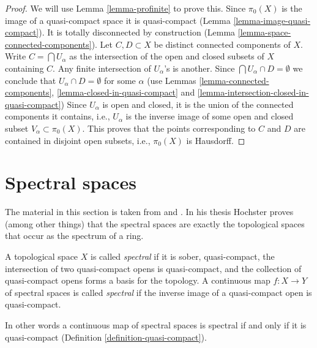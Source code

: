 \begin{proof}
We will use Lemma \ref{lemma-profinite} to prove this.
Since $\pi_0(X)$ is the image of a quasi-compact space it is
quasi-compact (Lemma \ref{lemma-image-quasi-compact}).
It is totally disconnected by construction
(Lemma \ref{lemma-space-connected-components}).
Let $C, D \subset X$ be distinct connected components of $X$.
Write $C = \bigcap U_\alpha$ as the intersection of the open and
closed subsets of $X$ containing $C$. Any finite intersection
of $U_\alpha$'s is another. Since $\bigcap U_\alpha \cap D = \emptyset$
we conclude that $U_\alpha \cap D = \emptyset$ for some $\alpha$
(use Lemmas \ref{lemma-connected-components},
\ref{lemma-closed-in-quasi-compact} and
\ref{lemma-intersection-closed-in-quasi-compact})
Since $U_\alpha$ is open and closed, it is the union of the
connected components it contains, i.e., $U_\alpha$ is the inverse
image of some open and closed subset $V_\alpha \subset \pi_0(X)$.
This proves that the points corresponding to $C$ and $D$
are contained in disjoint open subsets, i.e., $\pi_0(X)$ is
Hausdorff.
\end{proof}






\section{Spectral spaces}
\label{section-spectral}

\noindent
The material in this section is taken from \cite{Hochster} and
\cite{Hochster-thesis}. In his thesis Hochster proves (among
other things) that the spectral spaces are exactly the topological
spaces that occur as the spectrum of a ring.

\begin{definition}
\label{definition-spectral-space}
A topological space $X$ is called {\it spectral} if it is sober,
quasi-compact, the intersection of two quasi-compact opens is
quasi-compact, and the collection of quasi-compact opens forms a
basis for the topology. A continuous map $f : X \to Y$ of spectral
spaces is called {\it spectral} if the inverse image of a quasi-compact
open is quasi-compact.
\end{definition}

\noindent
In other words a continuous map of spectral spaces is spectral if and
only if it is quasi-compact (Definition \ref{definition-quasi-compact}).

